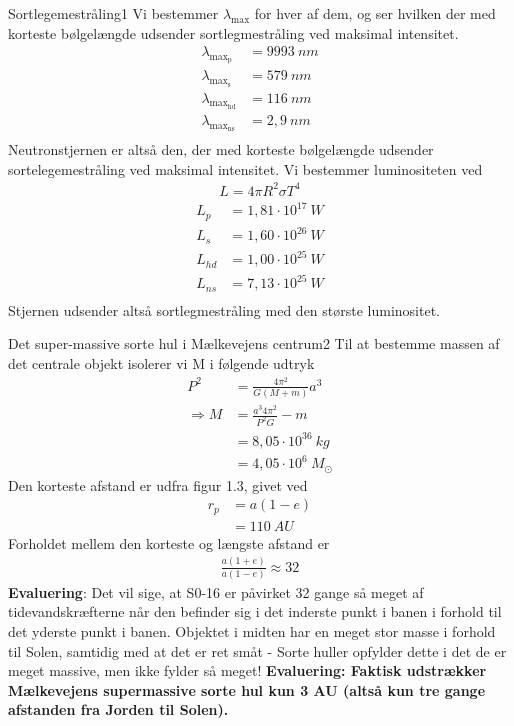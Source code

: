 \begin{opgave}{Sortlegemestråling}{1}
  \opg Vi bestemmer $\lambda_\text{max}$ for hver af dem, og ser hvilken der med korteste bølgelængde udsender sortlegmestråling ved maksimal intensitet. 
  \begin{align*}
  \lambda_{\text{max}_\text{p}} &= 9993~\si{nm}\\
  \lambda_{\text{max}_\text{s}} &= 579~\si{nm}\\
  \lambda_{\text{max}_\text{hd}} &= 116~\si{nm}\\
  \lambda_{\text{max}_\text{ns}} &= 2,9~\si{nm}\\
\end{align*}  
Neutronstjernen er altså den, der med korteste bølgelængde udsender sortelegemestråling ved maksimal intensitet.
\opg Vi bestemmer luminositeten ved 
 \begin{align*}
 L = 4\pi R^2 \sigma T^4
 \end{align*}
 \begin{align*}
 L_p &=1,81\cdot 10^{17}~\si{W}\\
 L_s &=1,60\cdot 10^{26}~\si{W}\\
 L_{hd} &=1,00\cdot 10^{25}~\si{W}\\
 L_{ns} &=7,13\cdot 10^{25}~\si{W}\\
 \end{align*}
 Stjernen udsender altså sortlegmestråling med den største luminositet. 
\end{opgave}

\begin{opgave}{Det super-massive sorte hul i Mælkevejens centrum}{2}
  \opg Til at bestemme massen af det centrale objekt isolerer vi M i følgende udtryk
  \begin{align*}
  P^2 &= \frac{4\pi ^2}{G\left( M+m\right)}a^3\\
  \Rightarrow M &= \frac{a^3 4\pi ^2}{P^2G}-m\\
  &=8,05\cdot 10^{36}~\si{kg}\\
  &=4,05\cdot 10^6~M_\odot
  \end{align*}
  \opg Den korteste afstand er udfra figur 1.3, givet ved
  \begin{align*}
  r_p &= a\left( 1-e\right)\\
  &= 110~\si{AU}
  \end{align*}
  \opg Forholdet mellem den korteste og længste afstand er 
  \begin{align*}
  \frac{a(1+e)}{a(1-e)} \approx 32
  \end{align*}
  \textbf{Evaluering}: Det vil sige, at S0-16 er påvirket 32 gange så meget af tidevandskræfterne når den befinder sig i det inderste punkt i banen i forhold til det yderste punkt i banen. 
  \opg Objektet i midten har en meget stor masse i forhold til Solen, samtidig med at det er ret småt - Sorte huller opfylder dette i det de er meget massive, men ikke fylder så meget!
  \textbf{Evaluering: Faktisk udstrækker Mælkevejens supermassive sorte hul kun 3 AU (altså kun tre gange afstanden fra Jorden til Solen).}
\end{opgave}


